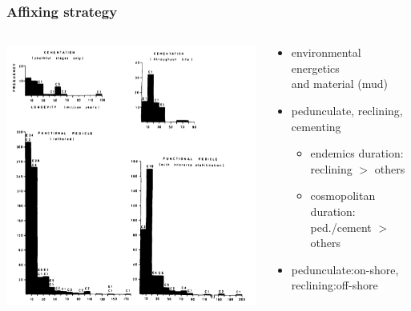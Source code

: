 \documentclass{beamer}
\begin{document}
\begin{frame}
  \frametitle{Affixing strategy}

  \begin{columns}
    \begin{column}{0.5\textwidth}
      \begin{center}
        \includegraphics[height = 0.8\textheight, width = \textwidth, keepaspectratio = true]{figure/affix}

        \tiny{}
      \end{center}
    \end{column}
    \begin{column}{0.5\textwidth}
      \begin{itemize}
        \item environmental energetics \\and material (mud)
        \item pedunculate, reclining, cementing
          \begin{itemize}
            \item endemics duration: \\reclining \(>\) others
            \item cosmopolitan duration: \\ped./cement \(>\) others
          \end{itemize}
        \item pedunculate:on-shore, reclining:off-shore
      \end{itemize}
    \end{column}
  \end{columns}
\end{frame}
\end{document}
